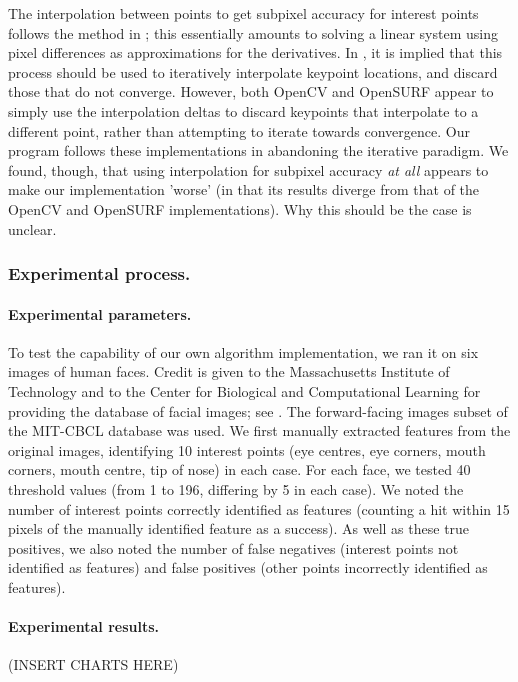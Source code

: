 The interpolation between points to get subpixel accuracy for interest points follows the method in \cite{inv-features}; this essentially amounts to solving a linear system using pixel differences as approximations for the derivatives. In \cite{SURF}, it is implied that this process should be used to iteratively interpolate keypoint locations, and discard those that do not converge. However, both OpenCV and OpenSURF appear to simply use the interpolation deltas to discard keypoints that interpolate to a different point, rather than attempting to iterate towards convergence. Our program follows these implementations in abandoning the iterative paradigm. We found, though, that using interpolation for subpixel accuracy \emph{at all} appears to make our implementation 'worse' (in that its results diverge from that of the OpenCV and OpenSURF implementations). Why this should be the case is unclear.

\subsubsection{Experimental process.}

\paragraph{Experimental parameters.}
To test the capability of our own algorithm implementation, we ran it on six images of human faces. Credit is given to the Massachusetts Institute of Technology and to the Center for Biological and Computational Learning for providing the database of facial images; see \cite{database}. The forward-facing images subset of the MIT-CBCL database was used. We first manually extracted features from the original images, identifying 10 interest points (eye centres, eye corners, mouth corners, mouth centre, tip of nose) in each case. 
For each face, we tested 40 threshold values (from 1 to 196, differing by 5 in each case). We noted the number of interest points correctly identified as features (counting a hit within 15 pixels of the manually identified feature as a success). As well as these true positives, we also noted the number of false negatives (interest points not identified as features) and false positives (other points incorrectly identified as features).

\paragraph{Experimental results.}
(INSERT CHARTS HERE)



